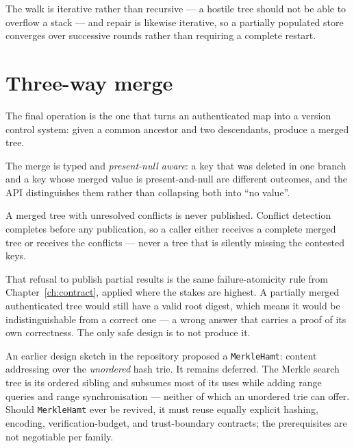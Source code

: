 \documentclass[11pt,twoside,openright]{book}
\newcommand{\code}[1]{\texorpdfstring{\textcolor{d7ink}{\texttt{#1}}}{#1}}
\begin{document}
The walk is iterative rather than recursive --- a hostile tree should not be able
to overflow a stack --- and repair is likewise iterative, so a partially
populated store converges over successive rounds rather than requiring a
complete restart.

\section{Three-way merge}

The final operation is the one that turns an authenticated map into a version
control system: given a common ancestor and two descendants, produce a merged
tree.

\begin{contractbox}
The merge is typed and \emph{present-null aware}: a key that was deleted in one
branch and a key whose merged value is present-and-null are different outcomes,
and the API distinguishes them rather than collapsing both into ``no value''.

A merged tree with unresolved conflicts is never published. Conflict detection
completes before any publication, so a caller either receives a complete merged
tree or receives the conflicts --- never a tree that is silently missing the
contested keys.
\end{contractbox}

That refusal to publish partial results is the same failure-atomicity rule from
Chapter~\ref{ch:contract}, applied where the stakes are highest. A partially
merged authenticated tree would still have a valid root digest, which means it
would be indistinguishable from a correct one --- a wrong answer that carries a
proof of its own correctness. The only safe design is to not produce it.

\begin{asidebox}
An earlier design sketch in the repository proposed a \code{MerkleHamt}: content
addressing over the \emph{unordered} hash trie. It remains deferred. The Merkle
search tree is its ordered sibling and subsumes most of its uses while adding
range queries and range synchronisation --- neither of which an unordered trie
can offer. Should \code{MerkleHamt} ever be revived, it must reuse equally
explicit hashing, encoding, verification-budget, and trust-boundary contracts;
the prerequisites are not negotiable per family.
\end{asidebox}

\end{document}
